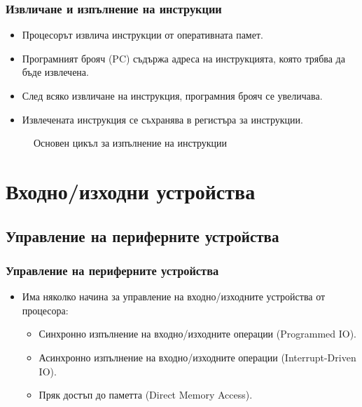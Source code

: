 \documentclass[ignorenonframetext, hyperref=unicode]{beamer}
\begin{document}
\begin{frame}
\frametitle{Извличане и изпълнение на инструкции}
\begin{itemize}
\item Процесорът извлича инструкции от оперативната памет.
\item Програмният брояч (PC) съдържа адреса на инструкцията, която трябва да
бъде извлечена.
\item След всяко извличане на инструкция, програмния брояч се увеличава.
\item Извлечената инструкция се съхранява в регистъра за инструкции.
\end{itemize}
\begin{figure}[h]
\center
{}
\caption{Основен цикъл за изпълнение на инструкции}
\end{figure}
\end{frame}

\section{Входно/изходни устройства}

\subsection{Управление на периферните устройства}

\begin{frame}
\frametitle{Управление на периферните устройства}
\begin{itemize}
\item Има няколко начина за управление на входно/изходните устройства от
процесора:
\begin{itemize}
  \item Синхронно изпълнение на входно/изходните операции (Programmed IO).
  \item Асинхронно изпълнение на входно/изходните операции (Interrupt-Driven IO).
  \item Пряк достъп до паметта (Direct Memory Access).
\end{itemize}
\end{itemize}
\end{frame}
\end{document}
